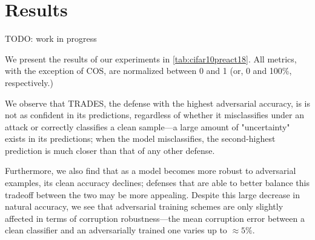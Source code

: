 \documentclass[a4paper]{article}
\begin{document}


\section{Results}

TODO: work in progress

We present the results of our experiments in \autoref{tab:cifar10preact18}. %
All metrics, with the exception of COS, are normalized between 0 and 1 (or, 0 and 100\%, respectively.)

We observe that TRADES, the defense with the highest adversarial accuracy, is
is not as confident in its predictions, regardless of whether it misclassifies
under an attack or correctly classifies a clean sample—a large amount of
"uncertainty" exists in its predictions; when the model misclassifies, the
second-highest prediction is much closer than that of any other defense.

Furthermore, we also find that as a model becomes more robust to adversarial
examples, its clean accuracy declines; defenses that are able to better balance
this tradeoff between the two may be more appealing. Despite this large decrease
in natural accuracy, we see that adversarial training schemes are only slightly
affected in terms of corruption robustness—the mean corruption error between a
clean classifier and an adversarially trained one varies up to $\approx 5\%$.



\end{document}
